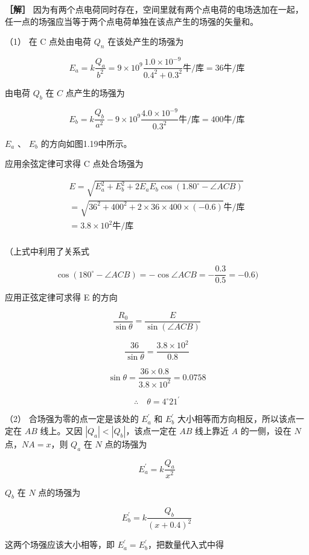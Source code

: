 \textbf{［解］}
因为有两个点电荷同时存在，空间里就有两个点电荷的电场迭加在一起，任一点的场强应当等于两个点电荷单独在该点产生的场强的矢量和。

（1） 在 C 点处由电荷 \(Q_{n}\) 在该处产生的场强为

\[
E_{a} = k \frac{Q_{a}}{b^{2}} = 9 \times 10^{9} \frac{1.0 \times 10^{- 9}}{0.4^{2} + 0.3^{2}} \text{牛/库} = 36 \text{牛/库}
\]

由电荷 \(Q_{b}\) 在 \(C\) 点产生的场强为

\[
E_{b} = k \frac{Q_{b}}{a^{2}} - 9 \times 10^{9} \frac{4.0 \times 10^{- 9}}{0.3^{2}} \text{牛/库} = 400 \text{牛/库}
\]

\(E_{a}\) 、 \(E_{b}\) 的方向如图1.19中所示。

应用余弦定律可求得 C 点处合场强为

\[
\begin{array}{l} E = \sqrt{E_{a}^{2} + E_{b}^{2} + 2 E_{a} E_{b} \cos (1.80^{\circ} - \angle A C B)} \\ = \sqrt{36^{2} + 400^{2} + 2 \times 36 \times 400 \times (- 0.6)} \text{牛/库} \\ = 3.8 \times 10^{2} \text{牛/库} \\ \end{array}
\]

（上式中利用了关系式

\[
\cos (180^{\circ} - \angle A C B) = - \cos \angle A C B = - \frac{0.3}{0.5} = - 0.6)
\]

应用正弦定律可求得 E 的方向

\[
\frac{R_{0}}{\sin \theta} = \frac{E}{\sin (\angle A C B)}
\]

\[
\frac{36}{\sin \theta} = \frac{3.8 \times 10^{2}}{0.8}
\]

\[
\sin \theta = \frac{36 \times 0.8}{3.8 \times 10^{2}} = 0.0758
\]

\[
\therefore \quad \theta = 4^{\circ} 21^{\prime}
\]

（2） 合场强为零的点一定是该处的 \(E_{a}^{\prime}\) 和
\(E_{b}^{\prime}\) 大小相等而方向相反，所以该点一定在 \(AB\) 线上。又因
\(|Q_{a}| < |Q_{b}|\)，该点一定在 \(AB\) 线上靠近 \(A\) 的一侧，设在
\(N\) 点，\(NA = x\)，则 \(Q_{a}\) 在 \(N\) 点的场强为

\[
E_{a}^{\prime} = k \frac{Q_{a}}{x^{2}}
\]

\(Q_{b}\) 在 \(N\) 点的场强为

\[
E_{b}^{\prime} = k \frac{Q_{b}}{(x + 0.4)^{2}}
\]

这两个场强应该大小相等，即
\(E_{a}^{\prime} = E_{b}^{\prime}\)，把数量代入式中得

